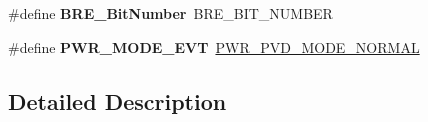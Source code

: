 \begin{DoxyCompactItemize}
\item 
\#define {\bfseries B\+R\+E\+\_\+\+Bit\+Number}~B\+R\+E\+\_\+\+B\+I\+T\+\_\+\+N\+U\+M\+B\+ER\hypertarget{group___h_a_l___p_w_r___aliased_ga1a0832bfe421cdd6f2640ffb625cc2d8}{}\label{group___h_a_l___p_w_r___aliased_ga1a0832bfe421cdd6f2640ffb625cc2d8}

\item 
\#define {\bfseries P\+W\+R\+\_\+\+M\+O\+D\+E\+\_\+\+E\+VT}~\hyperlink{group___p_w_r___p_v_d___mode_ga3a4bf701a36a14a4edf4dc5a28153277}{P\+W\+R\+\_\+\+P\+V\+D\+\_\+\+M\+O\+D\+E\+\_\+\+N\+O\+R\+M\+AL}\hypertarget{group___h_a_l___p_w_r___aliased_ga1092f618f6edca6f56e410e926455774}{}\label{group___h_a_l___p_w_r___aliased_ga1092f618f6edca6f56e410e926455774}

\end{DoxyCompactItemize}


\subsection{Detailed Description}
